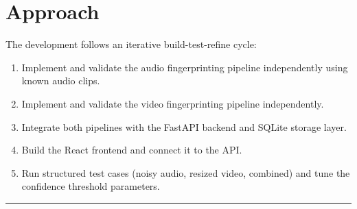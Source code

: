 \section{Approach}
The development follows an iterative build-test-refine cycle:
\begin{enumerate}
  \item Implement and validate the audio fingerprinting pipeline independently using known audio clips.
  \item Implement and validate the video fingerprinting pipeline independently.
  \item Integrate both pipelines with the FastAPI backend and SQLite storage layer.
  \item Build the React frontend and connect it to the API.
  \item Run structured test cases (noisy audio, resized video, combined) and tune the confidence threshold parameters.
\end{enumerate}

\vspace{10mm}
\hrule